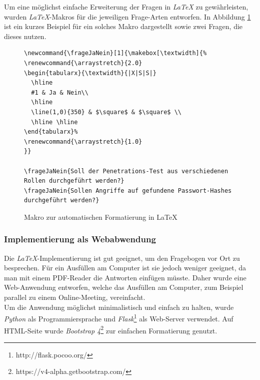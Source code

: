 Um eine möglichst einfache Erweiterung der Fragen in \textit{LaTeX} zu gewährleisten, wurden \textit{LaTeX}-Makros für die jeweiligen Frage-Arten entworfen. In Abbildung \ref{lst:PenProzVorbAutFormat} ist ein kurzes Beispiel für ein solches Makro dargestellt sowie zwei Fragen, die dieses nutzen.

\begin{figure}
\lstset{language=Tex}
\begin{lstlisting}
\newcommand{\frageJaNein}[1]{\makebox[\textwidth]{%
\renewcommand{\arraystretch}{2.0}
\begin{tabularx}{\textwidth}{|X|S|S|}
  \hline
  #1 & Ja & Nein\\
  \hline
  \line(1,0){350} & $\square$ & $\square$ \\
  \hline \hline
\end{tabularx}%
\renewcommand{\arraystretch}{1.0}
}}

\frageJaNein{Soll der Penetrations-Test aus verschiedenen Rollen durchgeführt werden?}
\frageJaNein{Sollen Angriffe auf gefundene Passwort-Hashes durchgeführt werden?}
\end{lstlisting}
\caption{Makro zur automatischen Formatierung in LaTeX}
\label{lst:PenProzVorbAutFormat}
\end{figure}

\subsubsection{Implementierung als Webabwendung}\label{ref:AufImplInWeb}
Die \textit{LaTeX}-Implementierung ist gut geeignet, um den Fragebogen vor Ort zu besprechen. Für ein Ausfüllen am Computer ist sie jedoch weniger geeignet, da man mit einem  PDF-Reader die Antworten einfügen müsste. Daher wurde eine Web-Anwendung entworfen, welche das Ausfüllen am Computer, zum Beispiel parallel zu einem Online-Meeting, vereinfacht.\\

\newpage
Um die Anwendung möglichst minimalistisch und einfach zu halten, wurde \textit{Python} als Programmiersprache und \textit{Flask}\footnote{http://flask.pocoo.org/} als Web-Server verwendet. Auf HTML-Seite wurde \textit{Bootstrap 4}\footnote{https://v4-alpha.getbootstrap.com/} zur einfachen Formatierung genutzt.\\

